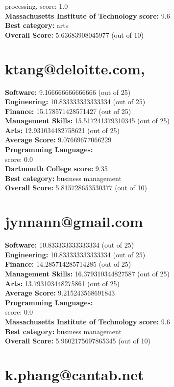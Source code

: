 \documentclass{article}
\begin{document}
processing, score: 1.0\\
\textbf{Massachusetts Institute of Technology} \textbf{score:} 9.6\\
\textbf{Best category: } arts\\
\textbf{Overall Score: }5.63683908045977 (out of 10)\section{ktang@deloitte.com,}
\textbf{Software:} 9.166666666666666 (out of 25)\\
\textbf{Engineering: } 10.833333333333334 (out of 25)\\
\textbf{Finance:} 15.178571428571427 (out of 25)\\
\textbf{Management Skills:} 15.517241379310345 (out of 25)\\
\textbf{Arts:} 12.931034482758621 (out of 25)\\
\textbf{Average Score: } 9.07669677066229\\
\textbf{Programming Languages:} \\
score: 0.0\\
\textbf{Dartmouth College} \textbf{score:} 9.35\\
\textbf{Best category: } business management\\
\textbf{Overall Score: }5.815728653530377 (out of 10)\section{jynnann@gmail.com}
\textbf{Software:} 10.833333333333334 (out of 25)\\
\textbf{Engineering: } 10.833333333333334 (out of 25)\\
\textbf{Finance:} 14.285714285714285 (out of 25)\\
\textbf{Management Skills:} 16.379310344827587 (out of 25)\\
\textbf{Arts:} 13.793103448275861 (out of 25)\\
\textbf{Average Score: } 9.215243568691843\\
\textbf{Programming Languages:} \\
score: 0.0\\
\textbf{Massachusetts Institute of Technology} \textbf{score:} 9.6\\
\textbf{Best category: } business management\\
\textbf{Overall Score: }5.9602175697865345 (out of 10)\section{k.phang@cantab.net}
\end{document}
